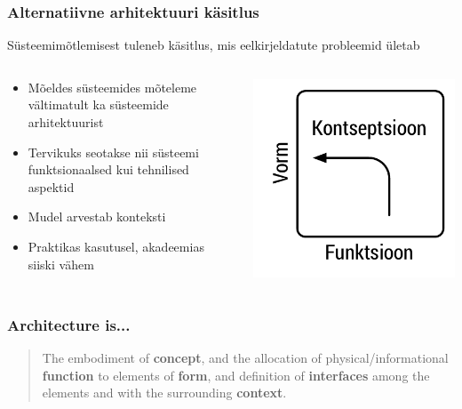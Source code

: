 \begin{frame}
	\frametitle{Alternatiivne arhitektuuri käsitlus}
	Süsteemimõtlemisest tuleneb käsitlus, mis eelkirjeldatute probleemid ületab
	\begin{columns}[t]
		\begin{column}{6.8cm}
			\begin{itemize}
				\item Mõeldes süsteemides mõteleme vältimatult ka süsteemide arhitektuurist
				\item Tervikuks seotakse nii süsteemi funktsionaalsed kui tehnilised aspektid 
				\item Mudel arvestab konteksti
				\item Praktikas kasutusel, akadeemias siiski vähem
			\end{itemize}
		\end{column}
		\begin{column}[T]{3.2cm}
			\vfill
			\includegraphics[width=\textwidth]{ffc.pdf}
		\end{column}
	\end{columns}

\end{frame}


\begin{frame}[fragile]
  \frametitle{Architecture is...}
  		\begin{center}
			\begin{quote}
			The embodiment of \textbf{concept}, and the allocation of physical/informational \textbf{function} to elements of \textbf{form}, and definition of \textbf{interfaces} among the elements and with the surrounding \textbf{context}.
			\end{quote}
		\end{center}
	\cite{edcrawley} 
\end{frame}

